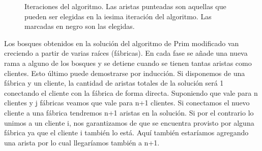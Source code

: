 \begin{figure}[H]
 \caption{Iteraciones del algoritmo. Las aristas punteadas son aquellas que pueden ser elegidas en la iesima iteración del algoritmo. Las marcadas en negro son las elegidas.}
 \label{}
\end{figure}

Los bosques obtenidos en la solución del algoritmo de Prim modificado van creciendo a partir de varias raíces (fábricas). En cada fase se añade una nueva rama a alguno de los bosques y se detiene cuando se tienen tantas aristas como clientes. Esto último puede demostrarse por inducción. Si disponemos de una fábrica y un cliente, la cantidad de aristas totales de la solución será 1 conectando el cliente con la fábrica de forma directa. Suponiendo que vale para n clientes y j fábricas veamos que vale para n+1 clientes. Si conectamos el nuevo cliente a una fábrica tendremos n+1 aristas en la solución. Si por el contrario lo unimos a un cliente i, nos garantizamos de que se encuentra provisto por alguna fábrica ya que el cliente i también lo está. Aquí también estaríamos agregando una arista por lo cual llegaríamos también a n+1.



